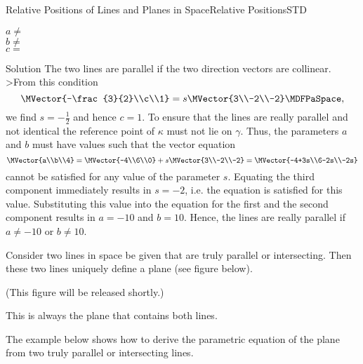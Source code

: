 \begin{MXContent}{Relative Positions of Lines and Planes in Space}{Relative Positions}{STD}
\begin{MExercise}
$a\neq$\\
$b\neq$\\
$c=$
\end{MExercise}

\begin{MHint}{Solution}
The two lines are parallel if the two direction vectors are collinear. >From this condition
\[
 \MVector{-\frac{3}{2}\\c\\1}=s\MVector{3\\-2\\-2}  \MDFPaSpace ,
\]
we find $s=-\frac{1}{2}$ and hence $c=1$. To ensure that the lines are really parallel and not identical 
the reference point of $\kappa$ must not lie on $\gamma$. Thus, the parameters $a$ and $b$ must have values 
such that the vector equation 
\[
 \MVector{a\\b\\4}=\MVector{-4\\6\\0}+s\MVector{3\\-2\\-2}=\MVector{-4+3s\\6-2s\\-2s}
\]
cannot be satisfied for any value of the parameter $s$. Equating the third component immediately results in 
$s=-2$, i.e. the equation is satisfied for this value. Substituting this value into the equation for the 
first and the second component results in $a=-10$ and $b=10$. Hence, the lines are really parallel 
if $a\neq-10$ or $b\neq10$.
\end{MHint}

Consider two lines in space be given that are truly parallel or intersecting. Then 
these two lines uniquely define a plane (see figure below).

(This figure will be released shortly.)

This is always the plane that contains both lines.

The example below shows how to derive the parametric equation of the plane from 
two truly parallel or intersecting lines.



\end{MXContent}
